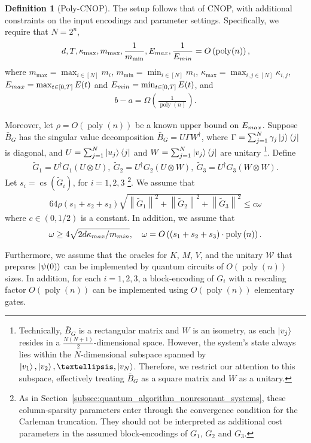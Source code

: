 \documentclass[10pt,a4paper]{amsart}
\theoremstyle{plain}
\theoremstyle{definition}
\newtheorem{definition}[thm]{Definition}
\theoremstyle{remark}
\newcommand{\norm}[1]     {\left\| #1 \right\|}
\newcommand{\lrb}[1]{\left ( #1 \right )}
\newcommand{\mypoly}[1]{\operatorname{poly} \lrb{#1}}
\newcommand{\myO}[1]{O\lrb{#1}}
\newcommand{\myOmega}[1]{\Omega\lrb{#1}}
\begin{document}
\begin{definition}[Poly-CNOP]
The setup follows that of CNOP, with additional constraints on the input encodings and parameter settings. Specifically, we require that $N=2^n$,  
\begin{align}
d, T, \kappa_{\max}, m_{\max}, \frac{1}{m_{\min}}, E_{\rm max}, \frac{1}{E_{\rm min}} = \myO{\operatorname{poly}(n)}, 
\end{align}
where $m_{\max} = \max_{i \in [N]} m_i$, $m_{\min} = \min_{i \in [N]} m_i$, $\kappa_{\max} = \max_{i,j \in [N]} \kappa_{i,j}$, $E_{\rm max}=\max_{t \in [0, T]} E(t)$
and
$E_{\rm min}=\min_{t \in [0, T]} E(t)$, and
\begin{align}
b - a = \myOmega{\frac{1}{\operatorname{poly}(n)}}.    
\end{align}
 
Moreover, let $\rho=\myO{\mypoly{n}}$ be a known upper bound on $E_{\rm max}$. Suppose $\bar{B}_G$ has the singular value decomposition $\bar{B}_G=U \Gamma W^\dagger$, where $\Gamma=\sum_{j=1}^N \gamma_j \ket{j}\bra{j}$ is diagonal, and $U=\sum_{j=1}^N \ket{u_j}\bra{j}$ and $W=\sum_{j=1}^{N} \ket{v_j}\bra{j}$ are unitary \footnote{Technically, $\bar{B}_G$ is a rectangular matrix and $W$ is an isometry, as each $\ket{v_j}$ resides in a $\frac{N(N+1)}{2}$-dimensional space. However, the system's state always lies within the $N$-dimensional subspace spanned by $\ket{v_1}, \ket{v_2}, \dots, \ket{v_N}$. Therefore, we restrict our attention to this subspace, effectively treating $\bar{B}_G$ as a square matrix and $W$ as a unitary.}. Define
\begin{align}
\tilde{G}_1=U^\dagger G_1 (U \otimes U),~
\tilde{G}_2=U^\dagger G_2 (U \otimes W),~
\tilde{G}_3=U^\dagger G_3 (W \otimes W).
\end{align}
Let $s_i=\operatorname{cs}(\tilde{G}_i)$, for $i=1,2,3$ \footnote{As in Section~\ref{subsec:quantum_algorithm_nonresonant_systems}, these column-sparsity parameters enter through the convergence condition for the Carleman truncation. They should not be interpreted as additional cost parameters in the assumed block-encodings of $G_1$, $G_2$ and $G_3$.}. We assume that
\begin{align}
    64 \rho (s_1+s_2+s_3)\sqrt{\norm{\tilde{G}_1}^2+\norm{\tilde{G}_2}^2+\norm{\tilde{G}_3}^2}\le c \omega
\end{align}
where $c \in (0,1/2)$ is a constant. In addition, we assume that 
\begin{align}
\omega \ge 4\sqrt{2d\kappa_{\rm max}/m_{\rm min}}, \quad \omega = \myO{(s_1+s_2+s_3) \cdot\mypoly{n}}.
\end{align}


Furthermore, we assume that the oracles for $K$, $M$, $V$, and the unitary $\mathcal{W}$ that prepares $\ket{\psi(0)}$ can be implemented by quantum circuits of $\myO{\operatorname{poly}(n)}$ sizes. In addition, for each $i=1,2,3$, 
a block-encoding of $G_i$ with a rescaling factor $\myO{\mypoly{n}}$ can be implemented using $\myO{\mypoly{n}}$ elementary gates. 

\end{definition}
\end{document}
